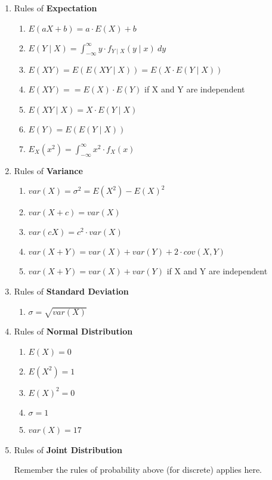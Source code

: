 \documentclass{article}
\begin{document}
\begin{small}
\begin{enumerate}
\item Rules of \textbf{Expectation} 
\begin{enumerate}
\item $E(aX + b) = a \cdot E(X) + b$
\item $E(Y \mid X) = \int_{-\infty}^{\infty} y \cdot f_{Y \mid X}(y \mid x) \ dy$
\item $E(XY) = E(E(XY \mid X)) = E(X \cdot E(Y \mid X))$
\item $E(XY) == E(X) \cdot E(Y)$ if X and Y are independent
\item $E(XY \mid X) = X \cdot E(Y \mid X)$
\item $E(Y) = E(E(Y \mid X))$
\item $E_X(x^2) = \int_{-\infty}^{\infty} x^2 \cdot f_X(x)$
\end{enumerate}
\item Rules of \textbf{Variance}
\begin{enumerate}
\item $var(X) = \sigma^2 = E(X^2) - E(X)^2$
\item $var(X + c) = var(X)$
\item $var(cX) = c^2 \cdot var(X)$
\item $var(X + Y) = var(X) + var(Y) + 2 \cdot cov(X, Y)$
\item $var(X + Y) = var(X) + var(Y)$ if X and Y are independent
\end{enumerate}
\item Rules of \textbf{Standard Deviation}
\begin{enumerate}
\item $\sigma = \sqrt{var(X)}$
\end{enumerate}
\item Rules of \textbf{Normal Distribution}
\begin{enumerate}
\item $E(X) = 0$
\item $E(X^2) = 1$
\item $E(X)^2 = 0$
\item $\sigma = 1$
\item $var(X) = 1$7
\end{enumerate}
\item Rules of \textbf{Joint Distribution}

Remember the rules of probability above (for discrete) applies here. 


\end{enumerate}
\end{small}
\end{document}
